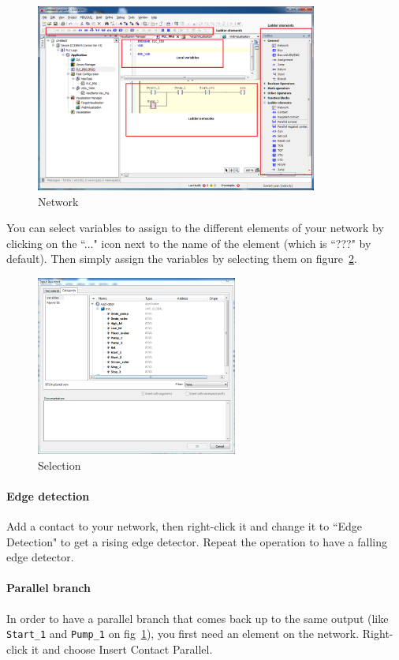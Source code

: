 \documentclass[10pt,a4paper]{article}
\begin{document}
\begin{figure}[h!]
	\begin{center}
		\includegraphics[width=350px]{img7.PNG}
	\end{center}
\caption{Network}
\label{fig:network}
\end{figure}

You can select variables to assign to the different elements of your network by clicking on the ``..." icon next to the name of the element (which is ``???" by default).
Then simply assign the variables by selecting them on figure~\ref{fig:sel}.

\begin{figure}[h!]
	\begin{center}
		\includegraphics[width=250px]{img8.PNG}
	\end{center}
\caption{Selection}
\label{fig:sel}
\end{figure}

\paragraph{Edge detection}
Add a contact to your network, then right-click it and change it to ``Edge Detection" to get a rising edge detector.
Repeat the operation to have a falling edge detector.

\paragraph{Parallel branch}
In order to have a parallel branch that comes back up to the same output (like \texttt{Start\_1} and \texttt{Pump\_1} on fig~\ref{fig:network}), you first need an element on the network.
Right-click it and choose Insert Contact Parallel.
\end{document}

